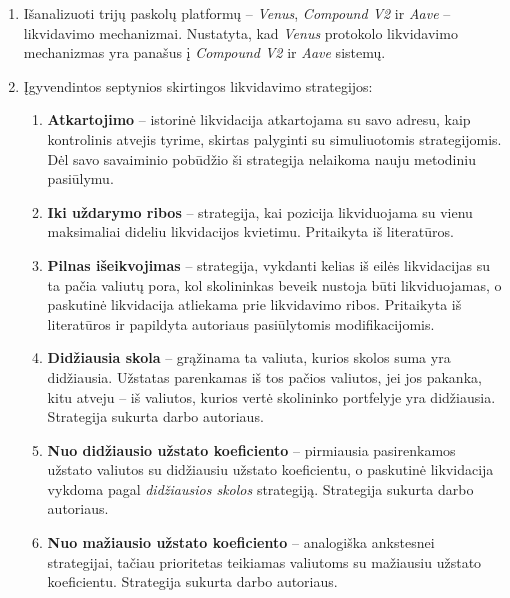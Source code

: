 \documentclass[]{VUMIFTemplateClass}
\begin{document}

\begin{enumerate}
\item Išanalizuoti trijų paskolų platformų – \textit{Venus}, \textit{Compound V2} ir \textit{Aave} – likvidavimo mechanizmai. Nustatyta, kad \textit{Venus} protokolo likvidavimo mechanizmas yra panašus į \textit{Compound V2} ir \textit{Aave} sistemų.
\item Įgyvendintos septynios skirtingos likvidavimo strategijos:
  \begin{enumerate}
  \item \textbf{Atkartojimo} – istorinė likvidacija atkartojama su savo adresu, kaip kontrolinis atvejis tyrime, skirtas palyginti su simuliuotomis strategijomis. Dėl savo savaiminio pobūdžio ši strategija nelaikoma nauju metodiniu pasiūlymu.
  \item \textbf{Iki uždarymo ribos} – strategija, kai pozicija likviduojama su vienu maksimaliai dideliu likvidacijos kvietimu. Pritaikyta iš literatūros.
  \item \textbf{Pilnas išeikvojimas} – strategija, vykdanti kelias iš eilės likvidacijas su ta pačia valiutų pora, kol skolininkas beveik nustoja būti likviduojamas, o paskutinė likvidacija atliekama prie likvidavimo ribos. Pritaikyta iš literatūros ir papildyta autoriaus pasiūlytomis modifikacijomis.
  \item \textbf{Didžiausia skola} – grąžinama ta valiuta, kurios skolos suma yra didžiausia. Užstatas parenkamas iš tos pačios valiutos, jei jos pakanka, kitu atveju – iš valiutos, kurios vertė skolininko portfelyje yra didžiausia. Strategija sukurta darbo autoriaus.
  \item \textbf{Nuo didžiausio užstato koeficiento} – pirmiausia pasirenkamos užstato valiutos su didžiausiu užstato koeficientu, o paskutinė likvidacija vykdoma pagal \textit{didžiausios skolos} strategiją. Strategija sukurta darbo autoriaus.
  \item \textbf{Nuo mažiausio užstato koeficiento} – analogiška ankstesnei strategijai, tačiau prioritetas teikiamas valiutoms su mažiausiu užstato koeficientu. Strategija sukurta darbo autoriaus.

\end{enumerate}
\end{enumerate}
\end{document}
